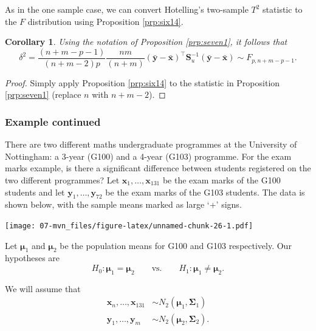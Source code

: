 \documentclass[
]{book}
\newtheorem{corollary}{Corollary}[chapter]
\theoremstyle{definition}
\theoremstyle{definition}
\theoremstyle{definition}
\theoremstyle{definition}
\theoremstyle{remark}
\begin{document}
As in the one sample case, we can convert Hotelling's two-sample \(T^2\) statistic to the \(F\) distribution using Proposition \ref{prp:six14}.

\begin{corollary}
\protect\hypertarget{cor:cseven1}{}{\label{cor:cseven1} }Using the notation of Proposition \ref{prp:seven1}, it follows that
\[\delta^2 = \frac{(n+m-p-1)}{(n+m-2)p} \frac{nm}{(n+m)} (\bar{\mathbf y} - \bar{\mathbf x})^\top \mathbf S_u^{-1} (\bar{\mathbf y} - \bar{\mathbf x}) \sim F_{p,n+m-p-1}.\]
\end{corollary}

\begin{proof}
Simply apply Proposition \ref{prp:six14} to the statistic in Proposition \ref{prp:seven1} (replace \(n\) with \(n+m-2\)).
\end{proof}

\hypertarget{example-continued-2}{%
\subsubsection*{Example continued}\label{example-continued-2}}

There are two different maths undergraduate programmes at the University of Nottingham: a 3-year (G100) and a 4-year (G103) programme. For the exam marks example, is there a significant difference between students registered on the two different programmes? Let \(\mathbf x_1,\ldots, \mathbf x_{131}\) be the exam marks of the G100 students and let \(\mathbf y_1,\ldots, \mathbf y_{72}\) be the exam marks of the G103 students. The data is shown below, with the sample means marked as large `+' signs.

\texttt{[image: 07-mvn\_files/figure-latex/unnamed-chunk-26-1.pdf]}

Let \({\boldsymbol{\mu}}_1\) and \({\boldsymbol{\mu}}_2\) be the population means for G100 and G103 respectively. Our hypotheses are
\[H_0: {\boldsymbol{\mu}}_1 = {\boldsymbol{\mu}}_2 \qquad \text{vs.} \qquad H_1: {\boldsymbol{\mu}}_1 \neq {\boldsymbol{\mu}}_2.\]

We will assume that
\begin{align*}
\mathbf x_n, \ldots, \mathbf x_{131}&\sim N_2({\boldsymbol{\mu}}_1,\boldsymbol{\Sigma}_1)\\
\mathbf y_1,\ldots,\mathbf y_m &\sim  N_2({\boldsymbol{\mu}}_2,\boldsymbol{\Sigma}_2).
\end{align*}
\end{document}
